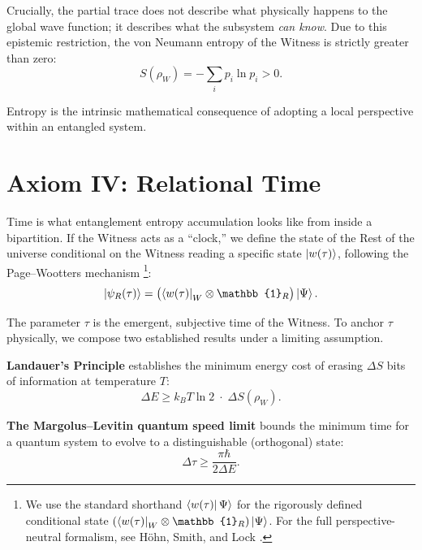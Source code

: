 \documentclass[12pt, a4paper]{article}
\begin{document}
Crucially, the partial trace does not describe what physically happens to the global wave function; it describes what the subsystem \emph{can know}. Due to this epistemic restriction, the von Neumann entropy of the Witness is strictly greater than zero:
\begin{equation}
S(\rho_W) = -\sum_i p_i \ln p_i > 0.
\label{eq:SW}
\end{equation}

Entropy is the intrinsic mathematical consequence of adopting a local perspective within an entangled system.

\section{Axiom IV: Relational Time}
\label{sec:axiom4}

Time is what entanglement entropy accumulation looks like from inside a bipartition. If the Witness acts as a ``clock,'' we define the state of the Rest of the universe conditional on the Witness reading a specific state $\ket{w(\tau)}$, following the Page--Wootters mechanism \cite{Page1983}\footnote{We use the standard shorthand $\bra{w(\tau)}\Psi\rangle$ for the rigorously defined conditional state $(\bra{w(\tau)}_W \otimes \mathbb{1}_R)\ket{\Psi}$. For the full perspective-neutral formalism, see H\"{o}hn, Smith, and Lock \cite{Hohn2021}.}:
\begin{equation}
\ket{\psi_R(\tau)} = \bigl(\bra{w(\tau)}_W \otimes \mathbb{1}_R\bigr)\ket{\Psi}.
\label{eq:PW}
\end{equation}

The parameter $\tau$ is the emergent, subjective time of the Witness. To anchor $\tau$ physically, we compose two established results under a limiting assumption.

\medskip
\noindent\textbf{Landauer's Principle} \cite{Landauer1961} establishes the minimum energy cost of erasing $\Delta S$ bits of information at temperature $T$:
\begin{equation}
\Delta E \geq k_B T \ln 2 \;\cdot\; \Delta S(\rho_W).
\label{eq:Landauer}
\end{equation}

\noindent\textbf{The Margolus--Levitin quantum speed limit} \cite{Margolus1998} bounds the minimum time for a quantum system to evolve to a distinguishable (orthogonal) state:
\begin{equation}
\Delta \tau \geq \frac{\pi \hbar}{2 \Delta E}.
\label{eq:ML}
\end{equation}
\end{document}
